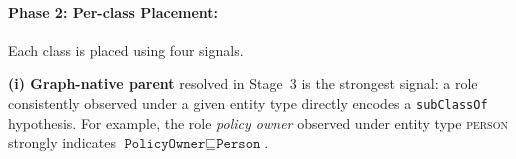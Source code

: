 \documentclass[sigconf]{acmart}
\begin{document}









\paragraph{\textbf{Phase 2: Per-class Placement:}} Each class is placed using four signals.

\textbf{(i) Graph-native parent} resolved in Stage~3 is the strongest signal: a role consistently observed under a given entity type directly encodes a \texttt{subClassOf} hypothesis. For example, the role \emph{policy owner} observed under entity type \textsc{person} strongly indicates $\texttt{PolicyOwner} \sqsubseteq \texttt{Person}$.
\end{document}
